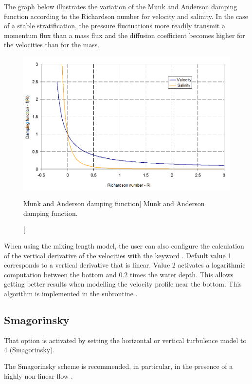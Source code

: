 The graph below illustrates the variation of the Munk and Anderson damping
function according to the Richardson number for velocity and salinity. In the
case of a stable stratification, the pressure fluctuations more readily
transmit a momentum flux than a mass flux and the diffusion coefficient becomes
higher for the velocities than for the mass.

\begin{figure}[H]%
\begin{center}
%
  \includegraphics[width=\textwidth]{./graphics/munk_anderson}
%
\end{center}
\caption
[Munk and Anderson damping function]
{Munk and Anderson damping function.}
\label{fig:munk_anderson}
\end{figure}

When using the mixing length model, the user can also configure the calculation
of the vertical derivative of the velocities with the keyword . Default value 1 corresponds
to a vertical derivative that is linear. Value 2 activates a logarithmic
computation between the bottom and 0.2 times the water depth. This allows
getting better results when modelling the velocity profile near the bottom.
This algorithm is implemented in the subroutine .


\subsection{Smagorinsky}

That option is activated by setting the horizontal or vertical turbulence
model to 4 (Smagorinsky).

The Smagorinsky scheme is recommended, in particular, in the presence of a
highly non-linear flow \cite{Smagorinsky1963}.


